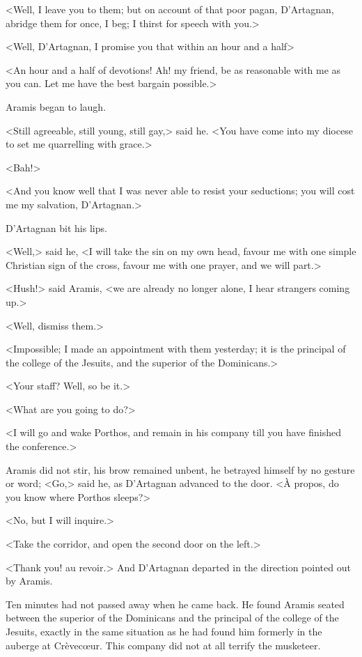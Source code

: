 <Well, I leave you to them; but on account of that poor pagan, D'Artagnan, abridge them for once, I beg; I thirst for speech with you.>

<Well, D'Artagnan, I promise you that within an hour and a half\longdash>

<An hour and a half of devotions! Ah! my friend, be as reasonable with me as you can. Let me have the best bargain possible.>

Aramis began to laugh.

<Still agreeable, still young, still gay,> said he. <You have come into my diocese to set me quarrelling with grace.>

<Bah!>

<And you know well that I was never able to resist your seductions; you will cost me my salvation, D'Artagnan.>

D'Artagnan bit his lips.

<Well,> said he, <I will take the sin on my own head, favour me with one simple Christian sign of the cross, favour me with one prayer, and we will part.>

<Hush!> said Aramis, <we are already no longer alone, I hear strangers coming up.>

<Well, dismiss them.>

<Impossible; I made an appointment with them yesterday; it is the principal of the college of the Jesuits, and the superior of the Dominicans.>

<Your staff? Well, so be it.>

<What are you going to do?>

<I will go and wake Porthos, and remain in his company till you have finished the conference.>

Aramis did not stir, his brow remained unbent, he betrayed himself by no gesture or word; <Go,> said he, as D'Artagnan advanced to the door. <À propos, do you know where Porthos sleeps?>

<No, but I will inquire.>

<Take the corridor, and open the second door on the left.>

<Thank you! au revoir.> And D'Artagnan departed in the direction pointed out by Aramis.

Ten minutes had not passed away when he came back. He found Aramis seated between the superior of the Dominicans and the principal of the college of the Jesuits, exactly in the same situation as he had found him formerly in the auberge at Crèvecœur. This company did not at all terrify the musketeer.

